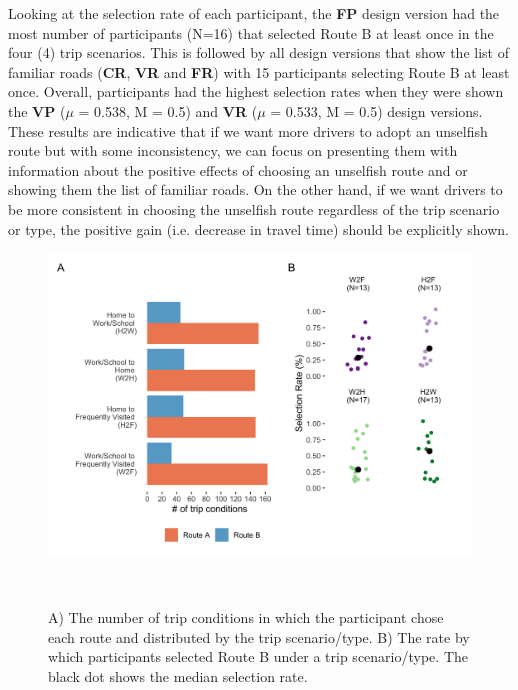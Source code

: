 Looking at the selection rate of each participant, the \textbf{FP} design version had the most number of participants (N=16) that selected Route B at least once in the four (4) trip scenarios. This is followed by all design versions that show the list of familiar roads (\textbf{CR}, \textbf{VR} and \textbf{FR}) with 15 participants selecting Route B at least once. Overall, participants had the highest selection rates when they were shown the \textbf{VP} ($\mu$ =  0.538, M = 0.5) and \textbf{VR} ($\mu$ =  0.533, M = 0.5) design versions. These results are indicative that if we want more drivers to adopt an unselfish route but with some inconsistency, we can focus on presenting them with information about the positive effects of choosing an unselfish route and or showing them the list of familiar roads. On the other hand, if we want drivers to be more consistent in choosing the unselfish route regardless of the trip scenario or type, the positive gain (i.e. decrease in travel time) should be explicitly shown. 

\begin{figure}[h]
\centering
  \includegraphics[scale=.2]{figures/s3-rc-unselfishratebytriptype.png}
  \caption{A) The number of trip conditions in which the participant chose each route and distributed by the trip scenario/type. B) The rate by which participants selected Route B under a trip scenario/type. The black dot shows the median selection rate.}~\label{fig:s3-rc-unselfishratebytriptype}
\end{figure}

